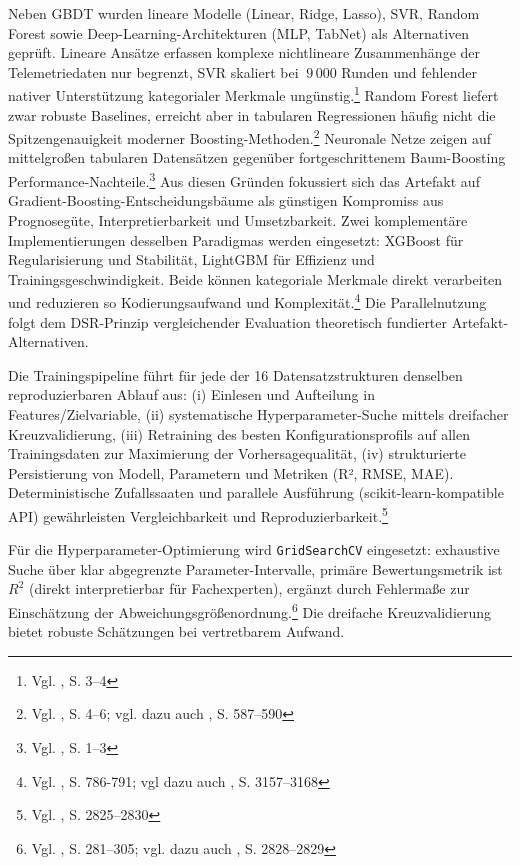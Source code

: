 Neben \ac{GBDT} wurden lineare Modelle (Linear, Ridge, Lasso), \ac{SVR}, Random Forest sowie Deep-Learning-Architekturen (MLP, TabNet) als Alternativen geprüft. Lineare Ansätze erfassen komplexe nichtlineare Zusammenhänge der Telemetriedaten nur begrenzt, \ac{SVR} skaliert bei \(~9\,000\) Runden und fehlender nativer Unterstützung kategorialer Merkmale ungünstig.\footnote{Vgl. \cite{Pasaribu2024}, S. 3–4} Random Forest liefert zwar robuste Baselines, erreicht aber in tabularen Regressionen häufig nicht die Spitzengenauigkeit moderner Boosting-Methoden.\footnote{Vgl. \cite{Geeks2024}, S. 4–6; vgl. dazu auch \cite{Hastie2009}, S. 587–590} Neuronale Netze zeigen auf mittelgroßen tabularen Datensätzen gegenüber fortgeschrittenem Baum-Boosting Performance-Nachteile.\footnote{Vgl. \cite{McElfresh2023}, S. 1–3} Aus diesen Gründen fokussiert sich das Artefakt auf Gradient-Boosting-Entscheidungsbäume als günstigen Kompromiss aus Prognosegüte, Interpretierbarkeit und Umsetzbarkeit.
Zwei komplementäre Implementierungen desselben Paradigmas werden eingesetzt: XGBoost für Regularisierung und Stabilität, LightGBM für Effizienz und Trainingsgeschwindigkeit. Beide können kategoriale Merkmale direkt verarbeiten und reduzieren so Kodierungsaufwand und Komplexität.\footnote{Vgl. \cite{Chen2016}, S. 786-791; vgl dazu auch \cite{Ke2017}, S. 3157–3168} Die Parallelnutzung folgt dem DSR-Prinzip vergleichender Evaluation theoretisch fundierter Artefakt-Alternativen.

Die Trainingspipeline führt für jede der 16 Datensatzstrukturen denselben reproduzierbaren Ablauf aus: (i) Einlesen und Aufteilung in Features/Zielvariable, (ii) systematische Hyperparameter-Suche mittels dreifacher Kreuzvalidierung, (iii) Retraining des besten Konfigurationsprofils auf allen Trainingsdaten zur Maximierung der Vorhersagequalität, (iv) strukturierte Persistierung von Modell, Parametern und Metriken (R², RMSE, MAE). Deterministische Zufallssaaten und parallele Ausführung (scikit-learn-kompatible API) gewährleisten Vergleichbarkeit und Reproduzierbarkeit.\footnote{Vgl. \cite{Pedregosa2011}, S. 2825–2830}

Für die Hyperparameter-Optimierung wird \texttt{GridSearchCV} eingesetzt: exhaustive Suche über klar abgegrenzte Parameter-Intervalle, primäre Bewertungsmetrik ist $R^2$ (direkt interpretierbar für Fachexperten), ergänzt durch Fehlermaße zur Einschätzung der Abweichungsgrößenordnung.\footnote{Vgl. \cite{Bergstra2012}, S. 281–305; vgl. dazu auch \cite{Pedregosa2011}, S. 2828–2829} Die dreifache Kreuzvalidierung bietet robuste Schätzungen bei vertretbarem Aufwand.

